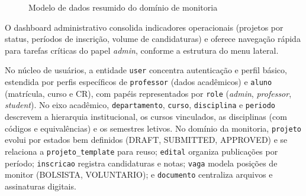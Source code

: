\documentclass[portuguese]{sbc2025}%
\begin{document}
\begin{figure}[h!]
  \centering
  \caption{Modelo de dados resumido do domínio de monitoria}
  \label{fig:data-model}
\end{figure}

O dashboard administrativo consolida indicadores operacionais (projetos por status, períodos de inscrição, volume de candidaturas) e oferece navegação rápida para tarefas críticas do papel \textit{admin}, conforme a estrutura do menu lateral.

No núcleo de usuários, a entidade \texttt{user} concentra autenticação e perfil básico, estendida por perfis específicos de \texttt{professor} (dados acadêmicos) e \texttt{aluno} (matrícula, curso e CR), com papéis representados por \texttt{role} (\textit{admin}, \textit{professor}, \textit{student}). No eixo acadêmico, \texttt{departamento}, \texttt{curso}, \texttt{disciplina} e \texttt{periodo} descrevem a hierarquia institucional, os cursos vinculados, as disciplinas (com códigos e equivalências) e os semestres letivos. No domínio da monitoria, \texttt{projeto} evolui por estados bem definidos (DRAFT, SUBMITTED, APPROVED) e se relaciona a \texttt{projeto\_template} para reuso; \texttt{edital} organiza publicações por período; \texttt{inscricao} registra candidaturas e notas; \texttt{vaga} modela posições de monitor (BOLSISTA, VOLUNTARIO); e \texttt{documento} centraliza arquivos e assinaturas digitais.
\end{document}
